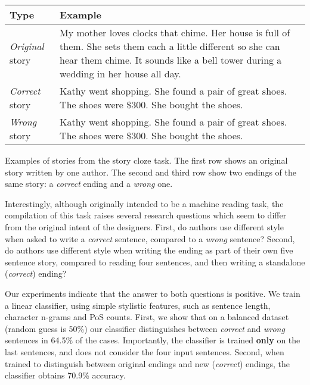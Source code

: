 \documentclass[11pt,a4paper]{article}
\begin{document}
\begin{table}[!t]
\begin{tabular}{|p{1.3cm}|p{5.6cm}|} \hline
{\bf Type} & {\bf Example} \\ \hline
{\it Original} story & My mother loves clocks that chime.	Her house is full of them.	She sets them each a little different so she can hear them chime.	It sounds like a bell tower during a wedding in her house all day.	{\color{blue}{When I visit I stop them or I'd never be able to sleep at night.}} \\ \hline
{\it Correct} story & Kathy went shopping.	She found a pair of great shoes.	The shoes were \$300.	She bought the shoes.	{\color{forestgreen}{She felt buyer's remorse after the purchase.}} \\ \hline
{\it Wrong} story & Kathy went shopping.	She found a pair of great shoes.	The shoes were \$300.	She bought the shoes.	{\color{red}{Kathy hated buying shoes.}} \\ \hline
\end{tabular}
\caption{\label{ROC-example}}
Examples of stories from the story cloze task. The first row shows an original story written by one author. 
The second and third row show two endings of the same story: a {\it correct} ending and a {\it wrong} one.
\end{table}


Interestingly, although originally intended to be a machine reading task, the compilation of this task raises several research questions which seem to differ from the original intent of the designers.
First, do authors use different style when asked to write a {\it correct} sentence, compared to a {\it wrong} sentence?
Second, do authors use different style when writing the ending as part of their own five sentence story, compared to reading four sentences, and then writing a standalone ({\it correct}) ending?

Our experiments indicate that the answer to both questions is positive. 
We train a linear classifier, using simple stylistic features, such as sentence length, character n-grams and PoS counts. 
First, we show that on a balanced dataset (random guess is 50\%) our classifier distinguishes between {\it correct} and {\it wrong} sentences in 64.5\% of the cases. 
Importantly, the classifier is trained {\bf only} on the last sentences, and does not consider the four input sentences.
Second, when trained to distinguish between original endings and new ({\it correct}) endings, the classifier obtains 70.9\% accuracy. 
\end{document}
